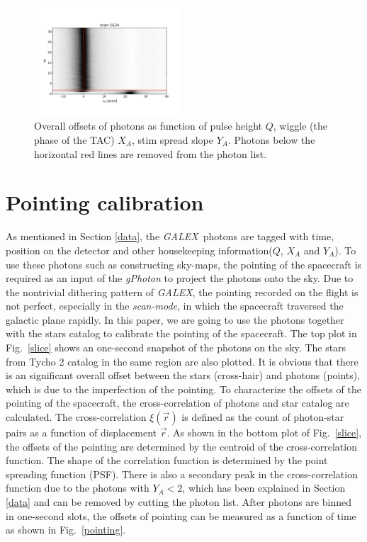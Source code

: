 \documentclass[12pt, preprint]{aastex}
\newcommand{\project}[1]{\textsl{#1}}
\newcommand{\galex}{\project{GALEX}}
\newcommand{\scanmode}{\project{scan-mode}}
\begin{document}
\begin{figure}[p]
\begin{center}
\includegraphics[width=0.49\textwidth]{figures/ya-y_tot}
\end{center}
\caption{%
  \label{meta}
  Overall offsets of photons as function of pulse height $Q$,  wiggle (the phase of the TAC)  $X_A$,  stim spread slope $Y_A$.
  Photons below the horizontal red lines are removed from the photon list.
  }
\end{figure}

\section{Pointing calibration}
\label{pc}
As mentioned in Section \ref{data}, the \galex\ photons are tagged with time, position on the detector and other housekeeping information($Q$, $X_A$ and $Y_A$).
To use these photons such as constructing sky-maps, the pointing of the spacecraft is required as an input of the 
\project{gPhoton} to project the photons onto the sky.
Due to the nontrivial dithering pattern of \galex, the pointing recorded on the flight is not perfect, especially in the \scanmode, in which the spacecraft traversed the galactic plane rapidly. 
In this paper, we are going to use the photons together with the stars catalog to calibrate the pointing of the spacecraft.
The top plot in Fig.~\ref{slice} shows an one-second snapshot of the photons on the sky.
The stars from Tycho 2 catalog \citep{tycho2} in the same region are also plotted. 
It is obvious that there is an significant overall offset between the stars (cross-hair) and photons (points),  which is due to the imperfection of the pointing.
To characterize the offsets of the pointing of the spacecraft, the cross-correlation of photons and star catalog are calculated.
The cross-correlation $\xi(\vec{r})$ is defined as the count of photon-star pairs as a function of displacement $\vec{r}$.
As shown in the bottom plot of Fig.~\ref{slice}, the offsets of the pointing are determined by the centroid of the cross-correlation function. 
The shape of the correlation function is determined by the point spreading function (PSF).
There is also a secondary peak in the cross-correlation function due to the photons with $Y_A<2$, which has been explained in Section \ref{data} and can be removed by cutting the photon list.
After photons are binned in one-second slots, the offsets of pointing can be measured as a function of time as shown in Fig.~\ref{pointing}.
\end{document}
